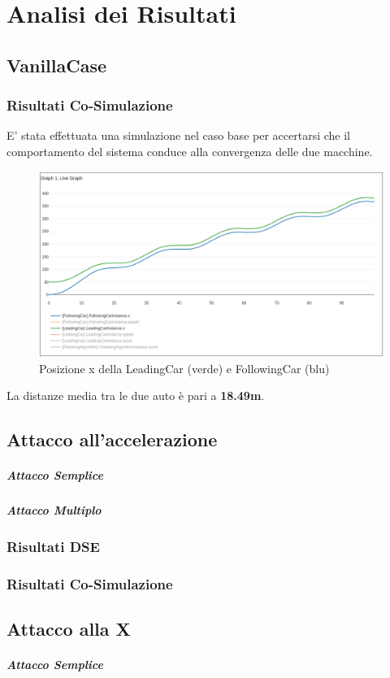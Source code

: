 \section{Analisi dei Risultati}
\subsection{VanillaCase}
\subsubsection{Risultati Co-Simulazione}
E' stata effettuata una simulazione nel caso base per accertarsi che il comportamento del sistema conduce alla convergenza delle due macchine.

\begin{figure}[h]
	\centering
	\includegraphics[width=\textwidth]{img/x.png}
	\caption{Posizione x della LeadingCar (verde) e FollowingCar (blu)}
\end{figure}

La distanze media tra le due auto è pari a \textbf{18.49m}.

\subsection{Attacco all'accelerazione}
\subparagraph{Attacco Semplice}
\subparagraph{Attacco Multiplo}
\subsubsection{Risultati DSE}
\subsubsection{Risultati Co-Simulazione}
\subsection{Attacco alla X}
\subparagraph{Attacco Semplice}
